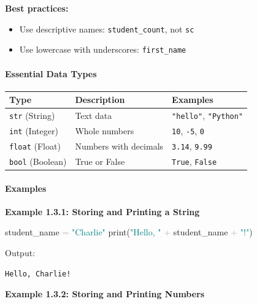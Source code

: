 \documentclass[
  justified,
  openright,
]{tufte-book}
\let\subsubsection\paragraph
\let\paragraph\paragraph
\newcommand{\BuiltInTok}[1]{#1}
\newcommand{\NormalTok}[1]{#1}
\newcommand{\OperatorTok}[1]{\textcolor{DarkGray}{#1}}
\newcommand{\StringTok}[1]{\textcolor{Teal}{#1}}
\newenvironment{Shaded}{%
  \begin{snugshade}
}{%
  \end{snugshade}
}
\let\subsubsection\paragraph
\let\paragraph\paragraph
\providecommand{\tightlist}{%
  \setlength{\itemsep}{0pt}\setlength{\parskip}{0pt}}
\begin{document}
\textbf{Best practices:}

\begin{itemize}
\tightlist
\item
  Use descriptive names: \texttt{student\_count}, not \texttt{sc}
\item
  Use lowercase with underscores: \texttt{first\_name}
\end{itemize}

\subsubsection{Essential Data Types}\label{essential-data-types}

{\def\LTcaptype{none} %
\begin{longtable}[]{@{}lll@{}}
\toprule\noalign{}
Type & Description & Examples \\
\midrule\noalign{}
\endhead
\bottomrule\noalign{}
\endlastfoot
\texttt{str} (String) & Text data & \texttt{"hello"},
\texttt{"Python"} \\
\texttt{int} (Integer) & Whole numbers & \texttt{10}, \texttt{-5},
\texttt{0} \\
\texttt{float} (Float) & Numbers with decimals & \texttt{3.14},
\texttt{9.99} \\
\texttt{bool} (Boolean) & True or False & \texttt{True},
\texttt{False} \\
\end{longtable}
}

\subsubsection{Examples}\label{examples-1}

\textbf{Example 1.3.1: Storing and Printing a String}

\begin{Shaded}
\begin{Highlighting}[]
\NormalTok{student\_name }\OperatorTok{=} \StringTok{"Charlie"}
\BuiltInTok{print}\NormalTok{(}\StringTok{"Hello, "} \OperatorTok{+}\NormalTok{ student\_name }\OperatorTok{+} \StringTok{"!"}\NormalTok{)}
\end{Highlighting}
\end{Shaded}

Output:

\begin{verbatim}
Hello, Charlie!
\end{verbatim}

\textbf{Example 1.3.2: Storing and Printing Numbers}
\end{document}
